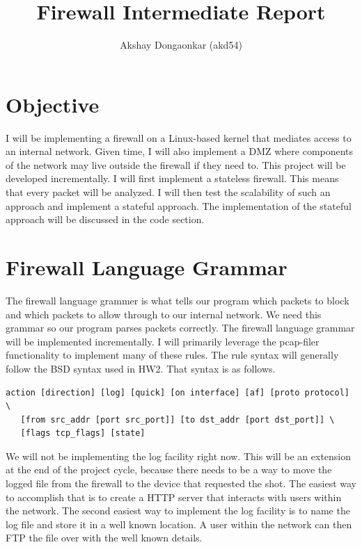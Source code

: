 \documentclass[12pt]{article}
\begin{document}
\title{Firewall Intermediate Report}
\author{Akshay Dongaonkar (akd54)}
\maketitle

\section{Objective}

I will be implementing a firewall on a Linux-based kernel that mediates
access to an internal network. 
Given time, I will also implement a DMZ where components of the network
may live outside the firewall if they need to.
This project will be developed incrementally. 
I will first implement a stateless firewall.
This means that every packet will be analyzed. 
I will then test the scalability of such an approach and
implement a stateful approach.
The implementation of the stateful approach will be discussed in the code
section.

\section{Firewall Language Grammar}

The firewall language grammer is what tells our program which packets to block
and which packets to allow through to our internal network.
We need this grammar so our program parses packets correctly.
The firewall language grammar will be implemented incrementally.
I will primarily leverage the pcap-filer functionality to implement many of
these rules.
The rule syntax will generally follow the BSD syntax used in HW2.
That syntax is as follows. \par
\begin{verbatim}
action [direction] [log] [quick] [on interface] [af] [proto protocol] \
   [from src_addr [port src_port]] [to dst_addr [port dst_port]] \
   [flags tcp_flags] [state]
\end{verbatim}

We will not be implementing the log facility right now.
This will be an extension at the end of the project cycle, because
there needs to be a way to move the logged file from the firewall to the
device that requested the shot.
The easiest way to accomplish that is to create a HTTP server that interacts
with users within the network.
The second easiest way to implement the log facility is to name the log file
and store it in a well known location.
A user within the network can then FTP the file over with the well known
details.  \par
\end{document}

